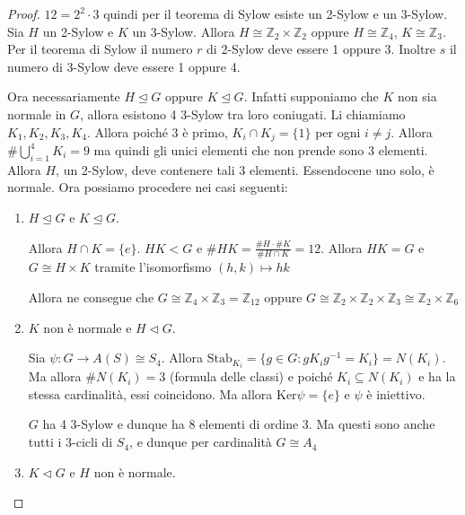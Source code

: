 \begin{proof}
    \(12 = 2^2 \cdot 3\) quindi per il teorema di Sylow esiste un 2-Sylow e un
    3-Sylow. Sia \(H\) un 2-Sylow e \(K\) un 3-Sylow. Allora \(H \cong
    \mathbb{Z}_2 \times \mathbb{Z}_2\) oppure \(H \cong \mathbb{Z}_4\), \(K
    \cong \mathbb{Z}_3\). Per il teorema di Sylow il numero \(r\) di 2-Sylow
    deve essere 1 oppure 3. %
    Inoltre \(s\) il numero di 3-Sylow deve essere 1 oppure 4. %

    Ora necessariamente \(H \trianglelefteq G\) oppure \(K \trianglelefteq G\).
    Infatti supponiamo che \(K\) non sia normale in \(G\), allora esistono 4
    3-Sylow tra loro coniugati. %
    Li chiamiamo \(K_{1}, K_{2}, K_{3}, K_{4}\). Allora poiché 3 è primo,
    \(K_{i} \cap K_{j} = \{1\} \) per ogni \(i\neq j\). Allora
    \(\# \bigcup_{i=1}^{4} K_{i} = 9 \)  ma quindi gli unici elementi che non
    prende sono 3 elementi. Allora \(H\), un 2-Sylow, deve contenere tali 3
    elementi. Essendocene uno solo, è normale. Ora possiamo procedere nei casi
    seguenti:
\begin{enumerate}[label = \arabic*.]
    \item \(H \trianglelefteq G\) e \(K \trianglelefteq G\).

        Allora \(H \cap K = \{e\} \). \(HK < G\) e \(\# HK = \frac{\# H \cdot \#
        K}{\# H \cap K} = 12\). Allora \(HK = G\) e \(G \cong H \times K\)
        tramite l'isomorfismo \({(h, k)} \mapsto hk\) 

        Allora ne consegue che \(G \cong \mathbb{Z}_4 \times \mathbb{Z}_3 =
        \mathbb{Z}_{12} \) oppure \(G \cong \mathbb{Z}_2 \times \mathbb{Z}_2
        \times \mathbb{Z}_3 \cong \mathbb{Z}_2 \times \mathbb{Z}_6\) 

    \item \(K\) non è normale e \(H \triangleleft G\).

    Sia \(\psi : G \to A{(S)} \cong S_{4}\).
    Allora \(\mathrm{Stab}_{K_{i}}  = \{g \in G : gK_{i}g^{-1} = K_{i}\} =
    N{(K_{i})}\). Ma allora \(\# N{(K_{i})} = 3\) (formula delle classi) e
    poiché \(K_{i} \subseteq N{(K_{i})} \) e ha la stessa cardinalità, essi
    coincidono. 
     Ma allora \(\mathrm{Ker}\psi = \{e\} \) e \(\psi\) è iniettivo.

     \(G\) ha 4 3-Sylow e dunque ha \(8\) elementi di ordine 3. Ma questi sono
     anche tutti i 3-cicli di \(S_{4}\), e dunque per cardinalità \(G \cong A_{4}\)  

     \item \(K \triangleleft G\) e \(H\) non è normale.
        
        
\end{enumerate}
\end{proof}

